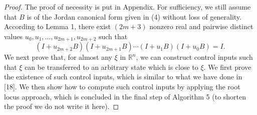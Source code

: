\documentclass[journal,a4paper,12pt,onecolumn]{IEEEtran}
\begin{document}
\begin{proof}
The proof of necessity is put in Appendix. For sufficiency, we still assume
that $B$ is of the Jordan canonical form given in (4) without loss of
generality. According to Lemma 1, there exist $\left( 2m+3\right) $ nonzero
real and pairwise distinct values $u_{0},u_{1},\ldots ,u_{2m+1},u_{2m+2}$
such that\begin{equation}
\left( I+u_{2m+2}B\right) \left( I+u_{2m+1}B\right) \cdots \left(
I+u_{1}B\right) \left( I+u_{0}B\right) =I\text{.}
\end{equation}We next prove that, for almost any $\xi $ in $\mathbb{R}
^{n}$, we can construct control inputs such that $\xi $ can be transferred
to an arbitrary state which is close to $\xi $. We first prove the existence
of such control inputs, which is similar to what we have done in [18]. We
then show how to compute such control inputs by applying the root locus
approach, which is concluded in the final step of Algorithm 5 (to shorten
the proof we do not write it here).


\end{proof}
\end{document}
